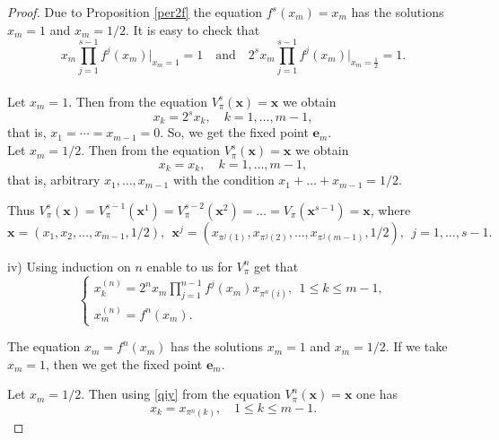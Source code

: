 \documentclass[11pt,reqno]{amsart}
\numberwithin{equation}{section} \setcounter{tocdepth}{1}
\begin{document}
\begin{proof}
Due to Proposition \ref{per2f} the equation $f^s(x_m)=x_m$ has the  solutions
$x_m=1$ and $x_m=1/2$. It is easy to check that
\begin{equation}\label{qiy}
x_m\prod\limits_{j=1}^{s-1} f^j(x_m)\Big|_{x_m=1}=1 \quad \text{and} \quad 2^s x_m\prod\limits_{j=1}^{s-1} f^j(x_m)\Big|_{x_m=\frac{1}{2}}=1 .
\end{equation}
\\

Let $x_m=1$. Then from the equation $V_\pi^s(\mathbf{x})=\mathbf{x}$ we obtain
\[x_{k}=2^s x_{k}, \quad   k=1,\dots,m-1, \]
that is, $x_1=\cdots=x_{m-1}=0$. So, we get the fixed point $\mathbf{e}_m$.\\

Let $x_m=1/2$. Then from the equation $V_\pi^s(\mathbf{x})=\mathbf{x}$ we obtain
\[x_{k}= x_{k}, \quad   k=1,\dots,m-1, \]
that is, arbitrary $ x_1,\dots,x_{m-1}$  with the condition $x_1+\dots+x_{m-1}=1/2$.

Thus $V_\pi^s(\mathbf{x})=V_\pi^{s-1}(\mathbf{x}^1) =V_\pi^{s-2}(\mathbf{x}^2) = \dots=V_\pi(\mathbf{x}^{s-1})=\mathbf{x}$, where
\[
\mathbf{x}=(x_1,x_2,\dots, x_{m-1},1/2 ), \ \  \mathbf{x}^{j}=(x_{\pi^{j}(1)},x_{\pi^{j}(2)},\dots, x_{\pi^{j}(m-1 )},1/2 ), \ \ j=1,\dots,s-1.\]


iv) Using induction on $n$ enable to us for $V_\pi^n$  get that
\begin{equation*}
\left\{\begin{array}{ll}
             x^{(n)}_{k}= 2^n x_m\prod\limits_{j=1}^{n-1} f^j(x_m) x_{\pi^{n}(i)}, \ \ 1\leq k\leq m-1, \\[2mm]
              x^{(n)}_{m}= f^n(x_m).
\end{array}\right.
\end{equation*}

  The equation $x_m=f^n(x_m)$ has the solutions $x_m=1$  and $x_m=1/2$.
 If we take  $x_m=1$, then we get the fixed point $\mathbf{e}_m$.

Let $x_m=1/2$. Then using \eqref{qiy} from the equation $V_\pi^n(\mathbf{x})=\mathbf{x}$ one has
\begin{equation}\label{deffer}
x_{k}=  x_{\pi^{n}(k)}, \quad 1\leq k \leq m-1.
\end{equation}




\end{proof}
\end{document}
